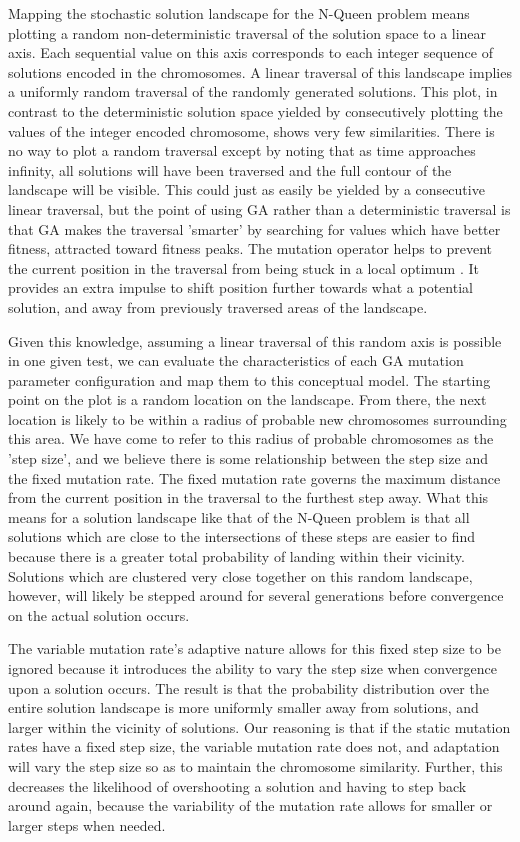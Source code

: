 \documentclass[conference]{IEEEtran}
\begin{document}
Mapping the stochastic solution landscape for the N-Queen problem means plotting a random non-deterministic traversal of the solution space to a linear axis. Each sequential value on this axis corresponds to each integer sequence of solutions encoded in the chromosomes. A linear traversal of this landscape implies a uniformly random traversal of the randomly generated solutions. This plot, in contrast to the deterministic solution space yielded by consecutively plotting the values of the integer encoded chromosome, shows very few similarities. There is no way to plot a random traversal except by noting that as time approaches infinity, all solutions will have been traversed and the full contour of the landscape will be visible. This could just as easily be yielded by a consecutive linear traversal, but the point of using GA rather than a deterministic traversal is that GA makes the traversal 'smarter' by searching for values which have better fitness, attracted toward fitness peaks\cite{srinivas1994genetic}. The mutation operator helps to prevent the current position in the traversal from being stuck in a local optimum \cite{ye2010some}. It provides an extra impulse to shift position further towards what a potential solution, and away from previously traversed areas of the landscape.

Given this knowledge, assuming a linear traversal of this random axis is possible in one given test, we can evaluate the characteristics of each GA mutation parameter configuration and map them to this conceptual model. The starting point on the plot is a random location on the landscape. From there, the next location is likely to be within a radius of probable new chromosomes surrounding this area. We have come to refer to this radius of probable chromosomes as the 'step size', and we believe there is some relationship between the step size and the fixed mutation rate. The fixed mutation rate governs the maximum distance from the current position in the traversal to the furthest step away. What this means for a solution landscape like that of the N-Queen problem is that all solutions which are close to the intersections of these steps are easier to find because there is a greater total probability of landing within their vicinity. Solutions which are clustered very close together on this random landscape, however, will likely be stepped around for several generations before convergence on the actual solution occurs.

The variable mutation rate's adaptive nature allows for this fixed step size to be ignored because it introduces the ability to vary the step size when convergence upon a solution occurs. The result is that the probability distribution over the entire solution landscape is more uniformly smaller away from solutions, and larger within the vicinity of solutions. Our reasoning is that if the static mutation rates have a fixed step size, the variable mutation rate does not, and adaptation will vary the step size so as to maintain the chromosome similarity. Further, this decreases the likelihood of overshooting a solution and having to step back around again, because the variability of the mutation rate allows for smaller or larger steps when needed.
\end{document}
